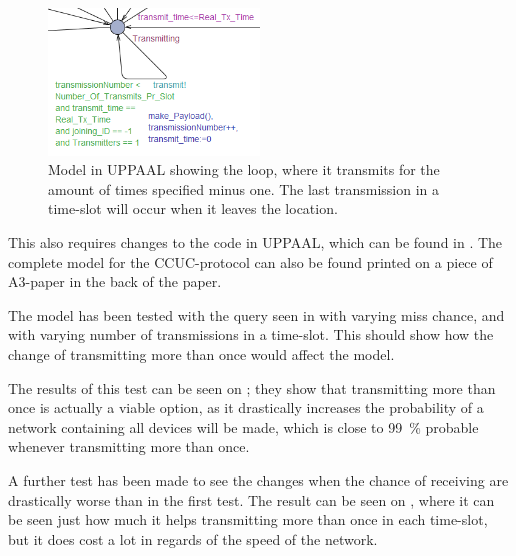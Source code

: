 \begin{figure}
\vspace{-10pt}
\centering
\includegraphics[width=0.5\textwidth]{Figures/Model/Transmit_Loop.PNG}
\vspace{-24pt} 
\caption{Model in UPPAAL showing the loop, where it transmits for the amount of times specified minus one. The last transmission in a time-slot will occur when it leaves the location.}
\label{LoopTransmitUPPAAL}
\vspace{-12pt}
\end{figure}

This also requires changes to the code in UPPAAL, which can be found in .
The complete model for the CCUC-protocol can also be found printed on a piece of A3-paper in the back of the paper.

The model has been tested with the query seen in  with varying miss chance, and with varying number of transmissions in a time-slot.
This should show how the change of transmitting more than once would affect the model.

The results of this test can be seen on ; they show that transmitting more than once is actually a viable option, as it drastically increases the probability of a network containing all devices will be made, which is close to 99~\% probable whenever transmitting more than once.

A further test has been made to see the changes when the chance of receiving are drastically worse than in the first test.
The result can be seen on , where it can be seen just how much it helps transmitting more than once in each time-slot, but it does cost a lot in regards of the speed of the network.

